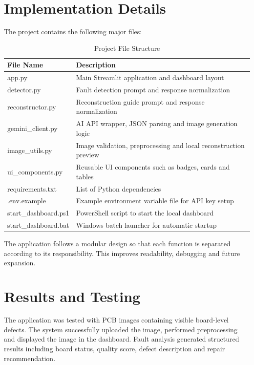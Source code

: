 \documentclass[12pt,a4paper]{report}
\begin{document}
\chapter{Implementation Details}

The project contains the following major files:

\begin{table}[H]
    \centering
    \begin{tabular}{p{5cm} p{9cm}}
        \toprule
        \textbf{File Name} & \textbf{Description}\\
        \midrule
        app.py & Main Streamlit application and dashboard layout\\
        detector.py & Fault detection prompt and response normalization\\
        reconstructor.py & Reconstruction guide prompt and response normalization\\
        gemini\_client.py & AI API wrapper, JSON parsing and image generation logic\\
        image\_utils.py & Image validation, preprocessing and local reconstruction preview\\
        ui\_components.py & Reusable UI components such as badges, cards and tables\\
        requirements.txt & List of Python dependencies\\
        .env.example & Example environment variable file for API key setup\\
        start\_dashboard.ps1 & PowerShell script to start the local dashboard\\
        start\_dashboard.bat & Windows batch launcher for automatic startup\\
        \bottomrule
    \end{tabular}
    \caption{Project File Structure}
\end{table}

The application follows a modular design so that each function is separated according to its responsibility. This improves readability, debugging and future expansion.

\chapter{Results and Testing}

The application was tested with PCB images containing visible board-level defects. The system successfully uploaded the image, performed preprocessing and displayed the image in the dashboard. Fault analysis generated structured results including board status, quality score, defect description and repair recommendation.
\end{document}

